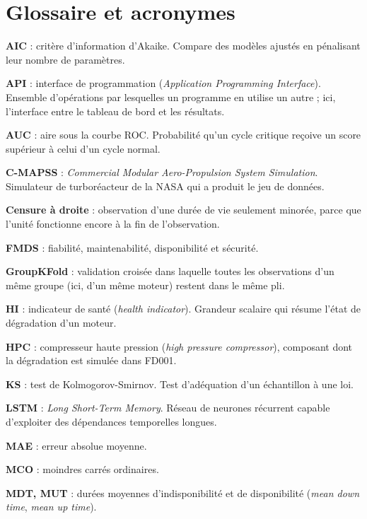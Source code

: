 \chapter*{Glossaire et acronymes}

{\small\setlength{\parskip}{3pt}
\textbf{AIC} : critère d'information d'Akaike. Compare des modèles ajustés en pénalisant leur nombre de paramètres.

\textbf{API} : interface de programmation (\emph{Application Programming Interface}). Ensemble d'opérations par lesquelles un programme en utilise un autre ; ici, l'interface entre le tableau de bord et les résultats.

\textbf{AUC} : aire sous la courbe ROC. Probabilité qu'un cycle critique reçoive un score supérieur à celui d'un cycle normal.

\textbf{C-MAPSS} : \emph{Commercial Modular Aero-Propulsion System Simulation}. Simulateur de turboréacteur de la NASA qui a produit le jeu de données.

\textbf{Censure à droite} : observation d'une durée de vie seulement minorée, parce que l'unité fonctionne encore à la fin de l'observation.

\textbf{FMDS} : fiabilité, maintenabilité, disponibilité et sécurité.

\textbf{GroupKFold} : validation croisée dans laquelle toutes les observations d'un même groupe (ici, d'un même moteur) restent dans le même pli.

\textbf{HI} : indicateur de santé (\emph{health indicator}). Grandeur scalaire qui résume l'état de dégradation d'un moteur.

\textbf{HPC} : compresseur haute pression (\emph{high pressure compressor}), composant dont la dégradation est simulée dans FD001.

\textbf{KS} : test de Kolmogorov-Smirnov. Test d'adéquation d'un échantillon à une loi.

\textbf{LSTM} : \emph{Long Short-Term Memory}. Réseau de neurones récurrent capable d'exploiter des dépendances temporelles longues.

\textbf{MAE} : erreur absolue moyenne.

\textbf{MCO} : moindres carrés ordinaires.

\textbf{MDT, MUT} : durées moyennes d'indisponibilité et de disponibilité (\emph{mean down time}, \emph{mean up time}).

}
